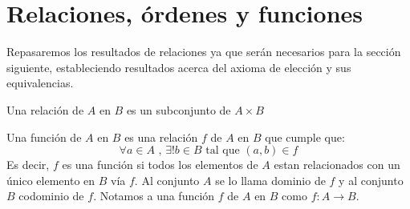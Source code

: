 \documentclass[12pt,a4paper]{book}
\begin{document}
\else
\fi

\section{Relaciones, órdenes y funciones}
Repasaremos los resultados de relaciones ya que serán necesarios para la sección siguiente, estableciendo resultados acerca del axioma de elección y sus equivalencias.

\begin{defi} %
Una relación de $A$ en $B$ es un subconjunto de $A \times B$
\end{defi}

\begin{defi} %
Una función de $A$ en $B$ es una relación $f$ de $A$ en $B$ que cumple que:
$$ \forall a \in A \mbox{ , } \exists ! b \in B \mbox{ tal que } (a,b) \in f$$
Es decir, $f$ es una función si todos los elementos de $A$ estan relacionados con un único elemento en $B$ vía $f$. Al conjunto $A$ se lo llama dominio de $f$ y al conjunto $B$ codominio de $f$. Notamos a una función $f$ de $A$ en $B$ como $f:A \rightarrow B$.
\end{defi}
\end{document}
